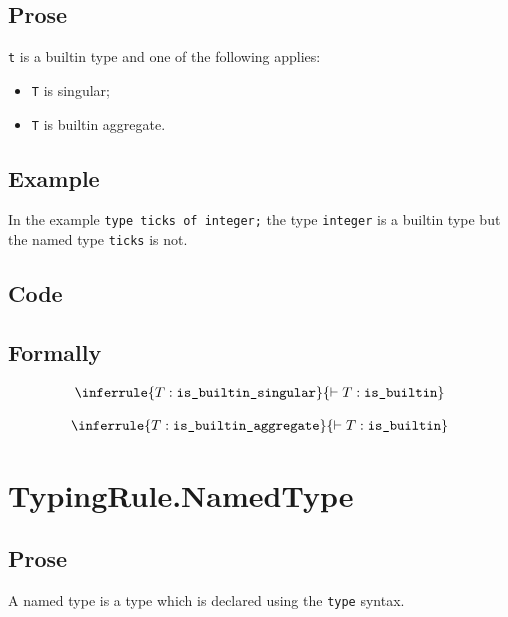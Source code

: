 \documentclass{book}
\newcommand\isbuiltinsingular[0]{\texttt{is\_builtin\_singular}}
\newcommand\isbuiltinaggregate[0]{\texttt{is\_builtin\_aggregate}}
\newcommand\isbuiltin[0]{\texttt{is\_builtin}}
\begin{document}
    \subsection{Prose}
    \texttt{t} is a builtin type and one of the following applies:
    \begin{itemize}
    \item \texttt{T} is singular;
    \item \texttt{T} is builtin aggregate.
    \end{itemize}

    \subsection{Example}
In the example \texttt{type ticks of integer;} the type \texttt{integer} is a builtin type but the named type \texttt{ticks} is not.

    \subsection{Code}

\begin{formal}
      \subsection{Formally}
\[
\begin{array}{c}
\inferrule{T : \isbuiltinsingular}{\entails T : \isbuiltin}\\
\\
\inferrule{T : \isbuiltinaggregate}{\entails T : \isbuiltin}\\
\end{array}
\]
\end{formal}


\section{TypingRule.NamedType \label{sec:TypingRule.NamedType} }

    \subsection{Prose}
    A named type is a type which is declared using the \texttt{type} syntax.
\end{document}
